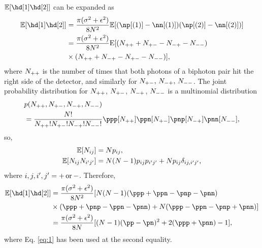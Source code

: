 $\E{\hd[1]\hd[2]}$ can be expanded as
\begin{equation}
\begin{aligned}\E{\hd[1]\hd[2]} & =\frac{\pi(\sigma^{2}+\epsilon^{2})}{8N^{2}}\E{(\np[(1)]-\nn[(1)])(\np[(2)]-\nn[(2)])}\\
 & =\frac{\pi(\sigma^{2}+\epsilon^{2})}{8N^{2}}{\rm E}[(\npp+\npn-\nnp-\nnn)\\
 & \times(\npp+\nnp-\npn-\nnn)],
\end{aligned}
\end{equation}
where $N_{++}$ is the number of times that both photons of a biphoton pair hit the right side of the detector, and similarly for $N_{+-},\,N_{-+},\,N_{--}$.
The joint probability distribution for $N_{++}$, $N_{+-}$, $N_{-+}$,
$N_{--}$ is a multinomial distribution
\begin{equation}
\begin{aligned} & p(\npp,\npn,\nnp,\nnn)\\
 & =\frac{N!}{\npp!\npn!\nnp!\nnn!}\ppp[\npp]\ppn[\npn]\pnp[\nnp]\pnn[\nnn],
\end{aligned}
\end{equation}
so,
\begin{equation}
\begin{aligned}{\mathbb E}[N_{ij}] & =Np_{ij},\\
{\mathbb E}[N_{ij}N_{i^{\prime}j^{\prime}}] & =N(N-1)p_{ij}p_{i^{\prime}j^{\prime}}+Np_{ij}\delta_{ij,i^{\prime}j^{\prime}},
\end{aligned}
\end{equation}
where $i,j,i^{\prime},j^{\prime}=+\,{\rm or}\,-$. Therefore,
\begin{equation}
\begin{aligned}
 \E{\hd[1]\hd[2]}& =\frac{\pi(\sigma^{2}+\epsilon^{2})}{8N^{2}}[N(N-1)(\ppp+\ppn-\pnp-\pnn)\\
 & \times(\ppp+\pnp-\ppn-\pnn)+N(\ppp-\ppn-\pnp+\pnn)]\\
 & =\frac{\pi(\sigma^{2}+\epsilon^{2})}{8N}[(N-1)(\pp-\pn)^{2}+2(\ppp+\pnn)-1],
\end{aligned}
\label{eq:4}
\end{equation}
where Eq. \eqref{eq:1} has been used at the second equality.

